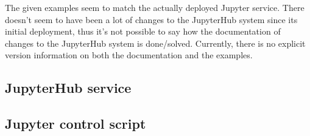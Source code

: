 The given examples seem to match the actually deployed Jupyter service.
There doesn't seem to have been a lot of changes to the JupyterHub system since its initial deployment, thus it's not possible to say how the documentation of changes to the JupyterHub system is done/solved.
Currently, there is no explicit version information on both the documentation and the examples.

\subsection{JupyterHub service}

\subsection{Jupyter control script}
